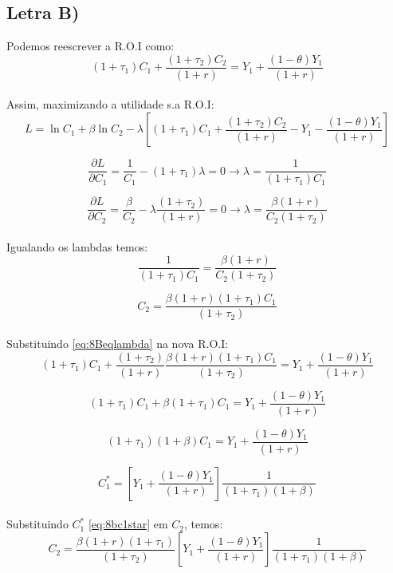 \documentclass{article}
\begin{document}
\subsection*{Letra B)}
Podemos reescrever a R.O.I como:
\begin{equation}\label{eq:8Broi}
    (1+\tau_1)C_1+\frac{(1+\tau_2)C_2}{(1+r)}=Y_1+\frac{(1-\theta)Y_1}{(1+r)}
\end{equation}
\\
Assim, maximizando a utilidade s.a R.O.I:
\begin{equation}
    L=\ln C_1 + \beta\ln C_2-\lambda\left[(1+\tau_1)C_1+\frac{(1+\tau_2)C_2}{(1+r)}-Y_1-\frac{(1-\theta)Y_1}{(1+r)}\right]
\end{equation}

\begin{equation}
    \frac{\partial L}{\partial C_1}=\frac{1}{C_1}-(1+\tau_1) \lambda=0 \to \lambda=\frac{1}{(1+\tau_1)C_1}
\end{equation}

\begin{equation}
    \frac{\partial L}{\partial C_2}=\frac{\beta}{C_2}-\lambda\frac{(1+\tau_2)}{(1+r)}=0 \to \lambda = \frac{\beta(1+r)}{C_2(1+\tau_2)}
\end{equation}
\\
Igualando os lambdas temos:
\begin{equation}
    \frac{1}{(1+\tau_1)C_1}=\frac{\beta(1+r)}{C_2(1+\tau_2)}
\end{equation}

\begin{equation}\label{eq:8Beqlambda}
    C_2=\frac{\beta(1+r)(1+\tau_1)C_1}{(1+\tau_2)}
\end{equation}
\\
Substituindo \eqref{eq:8Beqlambda} na nova R.O.I:
\begin{equation}
    (1+\tau_1)C_1+\frac{(1+\tau_2)}{(1+r)}\frac{\beta(1+r)(1+\tau_1)C_1}{(1+\tau_2)}=Y_1+\frac{(1-\theta)Y_1}{(1+r)}
\end{equation}

\begin{equation}
    (1+\tau_1)C_1+\beta(1+\tau_1)C_1=Y_1+\frac{(1-\theta)Y_1}{(1+r)}
\end{equation}

\begin{equation}
    (1+\tau_1)(1+\beta)C_1=Y_1+\frac{(1-\theta)Y_1}{(1+r)}
\end{equation}

\begin{equation}\label{eq:8bc1star}
    C_1^*=\left[ Y_1+\frac{(1-\theta)Y_1}{(1+r)}\right]\frac{1}{(1+\tau_1)(1+\beta)}
\end{equation}
\\
Substituindo $C_1^*$ \eqref{eq:8bc1star} em $C_2$, temos:
\begin{equation}
    C_2=\frac{\beta(1+r)(1+\tau_1)}{(1+\tau_2)}\left[ Y_1+\frac{(1-\theta)Y_1}{(1+r)}\right]\frac{1}{(1+\tau_1)(1+\beta)}
\end{equation}
\end{document}
